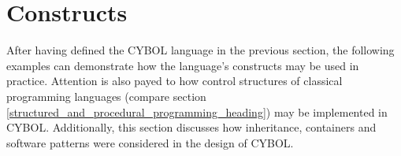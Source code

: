 %
%
%
%
%
%
%

\section{Constructs}
\label{constructs_heading}

After having defined the CYBOL language in the previous section, the following
examples can demonstrate how the language's constructs may be used in practice.
Attention is also payed to how control structures of classical programming
languages (compare section \ref{structured_and_procedural_programming_heading})
may be implemented in CYBOL. Additionally, this section discusses how
inheritance, containers and software patterns were considered in the design of
CYBOL.







